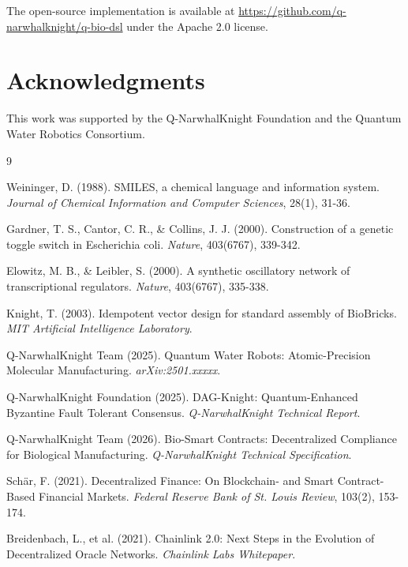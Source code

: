 \documentclass[12pt,a4paper]{article}
\begin{document}
The open-source implementation is available at \url{https://github.com/q-narwhalknight/q-bio-dsl} under the Apache 2.0 license.

\section*{Acknowledgments}

This work was supported by the Q-NarwhalKnight Foundation and the Quantum Water Robotics Consortium.


\begin{thebibliography}{9}

Weininger, D. (1988). SMILES, a chemical language and information system. \textit{Journal of Chemical Information and Computer Sciences}, 28(1), 31-36.

Gardner, T. S., Cantor, C. R., \& Collins, J. J. (2000). Construction of a genetic toggle switch in Escherichia coli. \textit{Nature}, 403(6767), 339-342.

Elowitz, M. B., \& Leibler, S. (2000). A synthetic oscillatory network of transcriptional regulators. \textit{Nature}, 403(6767), 335-338.

Knight, T. (2003). Idempotent vector design for standard assembly of BioBricks. \textit{MIT Artificial Intelligence Laboratory}.

Q-NarwhalKnight Team (2025). Quantum Water Robots: Atomic-Precision Molecular Manufacturing. \textit{arXiv:2501.xxxxx}.

Q-NarwhalKnight Foundation (2025). DAG-Knight: Quantum-Enhanced Byzantine Fault Tolerant Consensus. \textit{Q-NarwhalKnight Technical Report}.

Q-NarwhalKnight Team (2026). Bio-Smart Contracts: Decentralized Compliance for Biological Manufacturing. \textit{Q-NarwhalKnight Technical Specification}.

Schär, F. (2021). Decentralized Finance: On Blockchain- and Smart Contract-Based Financial Markets. \textit{Federal Reserve Bank of St. Louis Review}, 103(2), 153-174.

Breidenbach, L., et al. (2021). Chainlink 2.0: Next Steps in the Evolution of Decentralized Oracle Networks. \textit{Chainlink Labs Whitepaper}.

\end{thebibliography}
\end{document}
